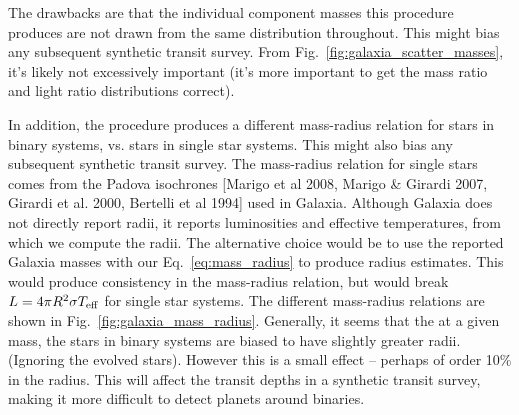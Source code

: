 \documentclass{emulateapj}
\begin{document}
The drawbacks are that the individual component masses this procedure produces 
are not drawn from the same distribution throughout.
This might bias any subsequent synthetic transit survey.
From Fig.~\ref{fig:galaxia_scatter_masses}, it's likely not excessively 
important (it's more important to get the mass ratio and light ratio 
distributions correct).

In addition, the procedure produces a different mass-radius relation 
for stars in binary systems, vs. stars in single star systems.
This might also bias any subsequent synthetic transit survey.
The mass-radius relation for single stars comes from the Padova isochrones 
[Marigo et al 2008, Marigo \& Girardi 2007, Girardi et al. 2000, Bertelli et al 
1994] used in Galaxia.
Although Galaxia does not directly report radii, it reports luminosities and 
effective temperatures, from which we compute the radii.
The alternative choice would be to use the reported Galaxia masses with our 
Eq.~\ref{eq:mass_radius} to produce radius estimates.
This would produce consistency in the mass-radius relation, but would break $L 
= 4\pi R^2 \sigma T_{\rm eff}$ for single star systems.
The different mass-radius relations are shown in 
Fig.~\ref{fig:galaxia_mass_radius}.
Generally, it seems that the at a given mass, the stars in binary systems are 
biased to have slightly greater radii. (Ignoring the evolved stars).
However this is a small effect -- perhaps of order 10\% in the radius.
This will affect the transit depths in a synthetic transit survey, making it 
more difficult to detect planets around binaries.
\end{document}

